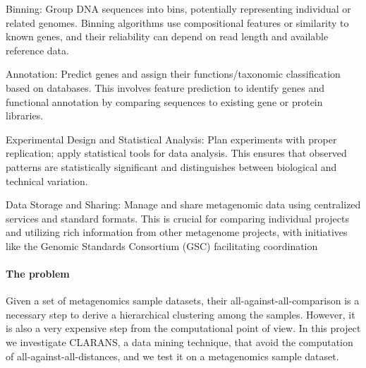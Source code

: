 Binning: Group DNA sequences into bins, potentially representing individual or related genomes. Binning algorithms use compositional features or similarity to known genes, and their reliability can depend on read length and available reference data.

Annotation: Predict genes and assign their functions/taxonomic classification based on databases. This involves feature prediction to identify genes and functional annotation by comparing sequences to existing gene or protein libraries.

Experimental Design and Statistical Analysis: Plan experiments with proper replication; apply statistical tools for data analysis. This ensures that observed patterns are statistically significant and distinguishes between biological and technical variation.

Data Storage and Sharing: Manage and share metagenomic data using centralized services and standard formats. This is crucial for comparing individual projects and utilizing rich information from other metagenome projects, with initiatives like the Genomic Standards Consortium (GSC) facilitating coordination

\paragraph{The problem} %
Given a set of metagenomics sample datasets, their all-against-all-comparison is a necessary step to derive a hierarchical clustering among the samples. However, it is also a very expensive step from the computational point of view. %
In this project we investigate CLARANS, a data mining technique, that avoid the computation of all-against-all-distances, and we test it on a metagenomics sample dataset.